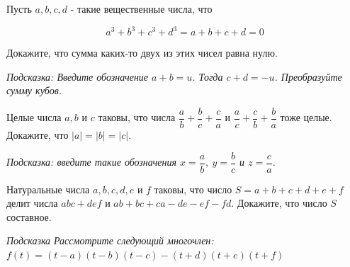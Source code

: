 \newpage

\hspace{3mm}

Пусть $a, b, c, d$ - такие вещественные числа, что

$$
a^3+b^3+c^3+d^3=a+b+c+d=0
$$

Докажите, что сумма каких-то двух из этих чисел равна нулю.

\textit{Подсказка: Введите обозначение $a+b=u$. Тогда $c+d=-u$. Преобразуйте сумму кубов.}

Целые числа $a, b$ и $c$ таковы, что числа $\dfrac{a}{b}+\dfrac{b}{c} +\dfrac{c}{a}$ и $\dfrac{a}{c}+\dfrac{c}{b}+\dfrac{b}{a}$ тоже целые. Докажите, что $|a|=|b|=|c|$.

\textit{Подсказка: введите такие обозначения $x=\dfrac{a}{b},\  y=\dfrac{b}{c}$ и $z=\dfrac{c}{a}$.}


Натуральные числа $a, b, c, d, e$ и $f$ таковы, что число $S=a+b+c+d+e+f$ делит числа $a b c+d e f$ и $a b+b c+c a-d e-e f-f d$. Докажите, что число $S$ составное.

\textit{Подсказка Рассмотрите следующий многочлен: $f(t)=(t-a)(t-b)(t-c)-(t+d)(t+e)(t+f)$}